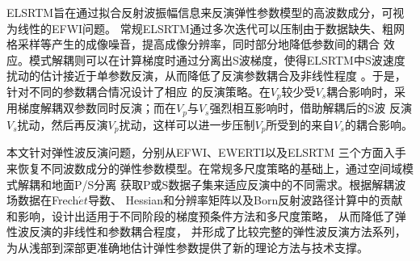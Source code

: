 \begin{cabstract}
	ELSRTM旨在通过拟合反射波振幅信息来反演弹性参数模型的高波数成分，可视为线性的EFWI问题。
	常规ELSRTM通过多次迭代可以压制由于数据缺失、粗网格采样等产生的成像噪音，提高成像分辨率，同时部分地降低参数间的耦合
	效应。模式解耦则可以在计算梯度时通过分离出S波梯度，使得ELSRTM中S波速度扰动的估计接近于单参数反演，从而降低了反演参数耦合及非线性程度
	。于是，针对不同的参数耦合情况设计了相应
	的反演策略。在$V_p$较少受$V_s$耦合影响时，采用梯度解耦双参数同时反演；而在$V_p$与$V_s$强烈相互影响时，借助解耦后的S波
	反演$V_s$扰动，然后再反演$V_p$扰动，这样可以进一步压制$V_p$所受到的来自$V_s$的耦合影响。

	本文针对弹性波反演问题，分别从EFWI、EWERTI以及ELSRTM
	三个方面入手来恢复不同波数成分的弹性参数模型。在常规多尺度策略的基础上，通过空间域模式解耦和地面P/S分离
	获取P或S数据子集来适应反演中的不同需求。根据解耦波场数据在Frech$\acute{e}t$导数、
	Hessian和分辨率矩阵以及Born反射波路径计算中的贡献和影响，设计出适用于不同阶段的梯度预条件方法和多尺度策略，
	从而降低了弹性波反演的非线性和参数耦合程度，
	并形成了比较完整的弹性波反演方法系列，为从浅部到深部更准确地估计弹性参数提供了新的理论方法与技术支撑。


\end{cabstract}


